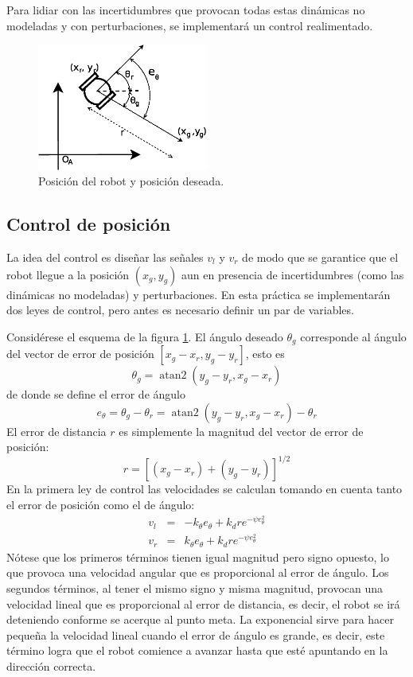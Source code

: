 \documentclass[letterpaper,12pt]{article}
\DeclareMathOperator{\atantwo}{atan2}
\begin{document}
Para lidiar con las incertidumbres que provocan todas estas dinámicas no modeladas y con perturbaciones, se implementará un control realimentado.
\begin{figure}
\centering
\includegraphics[width=0.5\textwidth]{Figures/GoalPose.eps}
\caption{Posición del robot y posición deseada.}
\label{fig:Coords}
\end{figure}

\subsection{Control de posición}
La idea del control es diseñar las señales $v_l$ y $v_r$ de modo que se garantice que el robot llegue a la posición $\left(x_g, y_g\right)$ aun en presencia de incertidumbres (como las dinámicas no modeladas) y perturbaciones. En esta práctica se implementarán dos leyes de control, pero antes es necesario definir un par de variables. 

Considérese el esquema de la figura \ref{fig:Coords}. El ángulo deseado $\theta_g$ corresponde al ángulo del vector de error de posición $\left[x_g - x_r, y_g - y_r\right]$, esto es
\[\theta_g = \atantwo\left(y_g - y_r, x_g - x_r\right)\]
de donde se define el error de ángulo
\[e_{\theta} = \theta_g - \theta_r = \atantwo\left(y_g - y_r, x_g - x_r\right) - \theta_r\]
El error de distancia $r$ es simplemente la magnitud del vector de error de posición:
\[r= \left[\left(x_g - x_r\right) + \left(y_g - y_r\right)\right]^{1/2}\]
En la primera ley de control las velocidades se calculan tomando en cuenta tanto el error de posición como el de ángulo:
\begin{eqnarray}
v_{l} &=& -k_{\theta}e_{\theta} + k_d r e^{-\psi e_{\theta}^2}\label{eq:Control11}\\
v_{r} &=&  k_{\theta}e_{\theta} + k_d r e^{-\psi e_{\theta}^2}\label{eq:Control12}
\end{eqnarray}
Nótese que los primeros términos tienen igual magnitud pero signo opuesto, lo que provoca una velocidad angular que es proporcional al error de ángulo. Los segundos términos, al tener el mismo signo y misma magnitud, provocan una velocidad lineal que es proporcional al error de distancia, es decir, el robot se irá deteniendo conforme se acerque al punto meta. La exponencial sirve para hacer pequeña la velocidad lineal cuando el error de ángulo es grande, es decir, este término logra que el robot comience a avanzar hasta que esté apuntando en la dirección correcta.
\end{document}
